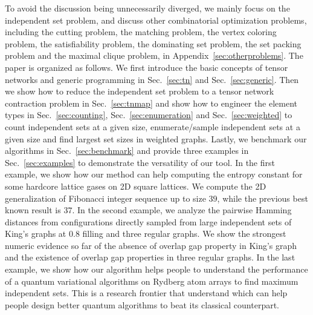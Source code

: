 \documentclass[onefignum, onetabnum]{siamart190516}
\newcommand{\<}{\langle}
\renewcommand{\>}{\rangle}
\newcommand{\Sec}[1]{Sec.~\ref{#1}}
\newcommand{\App}[1]{Appendix~\ref{#1}}
\newcommand{\xpurple}[1]{[{\bf  \color{purple}{\sout{MC: #1}}}]}
\newcounter{example}
\begin{document}

To avoid the discussion being unnecessarily diverged, we mainly focus on the independent set problem,
and discuss other combinatorial optimization problems,
including the cutting problem, the matching problem, the vertex coloring problem, the satisfiability problem, the dominating set problem, the set packing problem and the maximal clique problem, in \App{sec:otherproblems}.
The paper is organized as follows.
We first introduce the basic concepts of tensor networks and generic programming in \Sec{sec:tn} and \Sec{sec:generic}.
Then we show how to reduce the independent set problem to a tensor network contraction problem in \Sec{sec:tnmap}
and show how to engineer the element types in \Sec{sec:counting}, \Sec{sec:enumeration} and \Sec{sec:weighted} to count independent sets at a given size, enumerate/sample independent sets at a given size and find largest set sizes in weighted graphs.
Lastly, we benchmark our algorithms in \Sec{sec:benchmark} and provide three examples in \Sec{sec:examples} to demonstrate the versatility of our tool.
In the first example, we show how our method can help computing the entropy constant for some hardcore lattice gases on 2D square lattices. We compute the 2D generalization of Fibonacci integer sequence up to size $39$, while the previous best known result is $37$.
In the second example, we analyze the pairwise Hamming distances from configurations directly sampled from large independent sets of King's graphs at $0.8$ filling and three regular graphs. We show the strongest numeric evidence so far of the absence of overlap gap property in King's graph and the existence of overlap gap properties in three regular graphs.
In the last example, we show how our algorithm helps people to understand the performance of a quantum variational algorithms on Rydberg atom arrays to find maximum independent sets. This is a research frontier that understand which can help people design better quantum algorithms to beat its classical counterpart.
\end{document}

